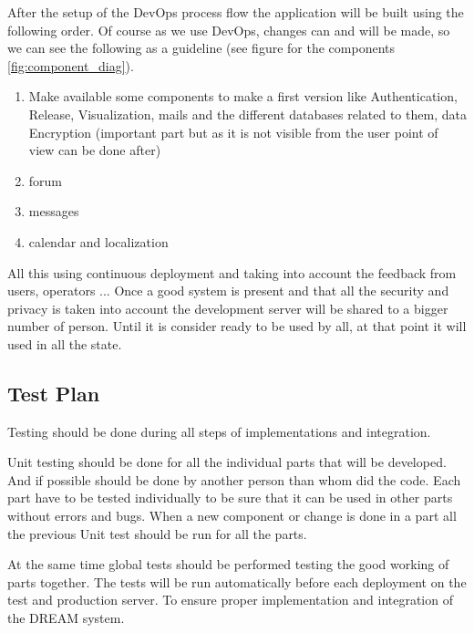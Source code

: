 After the setup of the DevOps process flow the application will be built using the following order. Of course as we use DevOps, changes can and will be made, so we can see the following as a guideline (see figure for the components \ref{fig:component_diag}).

\begin{enumerate}
	\item Make available some components to make a first version like Authentication, Release, Visualization, mails and the different databases related to them, data Encryption (important part but as it is not visible from the user point of view can be done after)
	\item forum
	\item messages
	\item calendar and localization
\end{enumerate}
All this using continuous deployment and taking into account the feedback from users, operators ...
Once a good system is present and that all the security and privacy is taken into account the development server will be shared to a bigger number of person. Until it is consider ready to be used by all, at that point it will used in all the state.
\subsection{Test Plan}
Testing should be done during all steps of implementations and integration.

Unit testing should be done for all the individual parts that will be developed. And if possible should be done by another person than whom did the code. Each part have to be tested individually to be sure that it can be used in other parts without errors and bugs. When a new component or change is done in a part all the previous Unit test should be run for all the parts.

At the same time global tests should be performed testing the good working of parts together. The tests will be run automatically before each deployment on the test and production server. To ensure proper implementation and integration of the DREAM system.